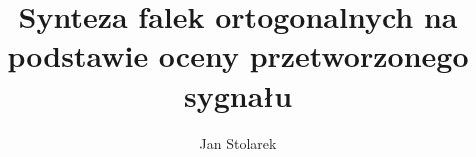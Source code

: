 \documentclass[a4paper,12pt,twoside]{book}
\author{Jan Stolarek}
\title{Synteza falek ortogonalnych na podstawie oceny przetworzonego sygnału}
\begin{document}
\frontmatter

\tableofcontents

\mainmatter
\pagestyle{headings}










\appendix
\renewcommand{\chaptermark}[1]{%
\markboth{\MakeUppercase{%
DODATEK \thechapter.%
\ }}{}}


\end{document}
